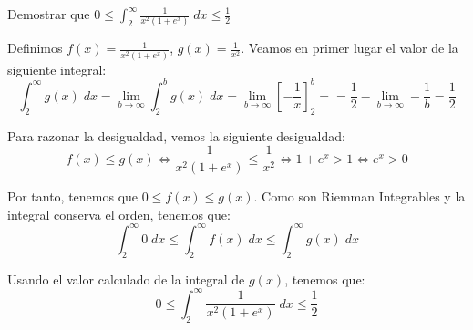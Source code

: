 \documentclass[12pt]{article}
\begin{document}
\begin{ejercicio}
    Demostrar que $0\leq \int_2^\infty \frac{1}{x^2(1+e^x)}\;dx \leq \frac{1}{2}$

    Definimos $f(x)=\frac{1}{x^2(1+e^x)}$, $g(x)=\frac{1}{x^2}$. Veamos en primer lugar el valor de la siguiente integral:
    \begin{equation*}
        \int_2^\infty g(x)\;dx
        = \lim_{b\to \infty} \int_2^b g(x)\;dx
        = \lim_{b\to \infty} \left[-\frac{1}{x}\right]_2^b = 
        = \frac{1}{2} - \lim_{b\to \infty} -\frac{1}{b} = \frac{1}{2}
    \end{equation*}

    Para razonar la desigualdad, vemos la siguiente desigualdad:
    \begin{equation*}
        f(x)\leq g(x) \Longleftrightarrow \frac{1}{x^2(1+e^x)}\leq \frac{1}{x^2} \Longleftrightarrow 1+e^x>1 \Longleftrightarrow e^x >0
    \end{equation*}
    
    Por tanto, tenemos que $0\leq f(x)\leq g(x)$. Como son Riemman Integrables y la integral conserva el orden, tenemos que:
    \begin{equation*}
        \int_2^\infty 0\;dx \leq \int_2^\infty f(x)\;dx \leq \int_2^\infty g(x)\;dx
    \end{equation*}

    Usando el valor calculado de la integral de $g(x)$, tenemos que:
    \begin{equation*}
        0\leq \int_2^\infty \frac{1}{x^2(1+e^x)}\;dx \leq \frac{1}{2}
    \end{equation*}
\end{ejercicio}
\end{document}

